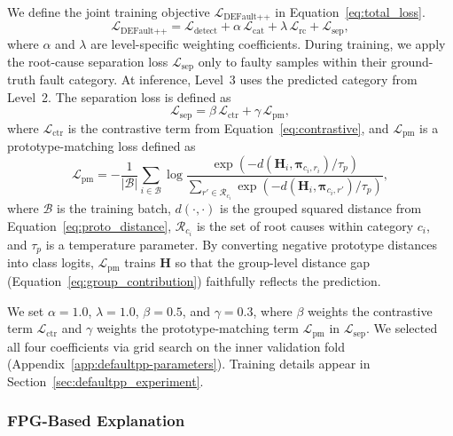 We define the joint training objective $\mathcal{L}_{\text{DEFault++}}$ in Equation~\ref{eq:total_loss}.
\begin{equation}
\mathcal{L}_{\text{DEFault++}} = \mathcal{L}_{\text{detect}} + \alpha \, \mathcal{L}_{\text{cat}} + \lambda \, \mathcal{L}_{\text{rc}} + \mathcal{L}_{\text{sep}},
\label{eq:total_loss}
\end{equation}
where $\alpha$ and $\lambda$ are level-specific weighting coefficients. During training, we apply the root-cause separation loss $\mathcal{L}_{\text{sep}}$ only to faulty samples within their ground-truth fault category. At inference, Level~3 uses the predicted category from Level~2. The separation loss is defined as
\begin{equation}
\mathcal{L}_{\text{sep}} = \beta \, \mathcal{L}_{\text{ctr}} + \gamma \, \mathcal{L}_{\text{pm}},
\label{eq:separation_loss}
\end{equation}
where $\mathcal{L}_{\text{ctr}}$ is the contrastive term from Equation~\ref{eq:contrastive}, and $\mathcal{L}_{\text{pm}}$ is a prototype-matching loss defined as
\begin{equation}
\mathcal{L}_{\text{pm}} = -\frac{1}{|\mathcal{B}|} \sum_{i \in \mathcal{B}} \log \frac{\exp(-d(\mathbf{H}_i, \symbf{\pi}_{c_i, r_i}) / \tau_p)}{\sum_{r' \in \mathcal{R}_{c_i}} \exp(-d(\mathbf{H}_i, \symbf{\pi}_{c_i, r'}) / \tau_p)},
\label{eq:proto_matching}
\end{equation}
where $\mathcal{B}$ is the training batch, $d(\cdot, \cdot)$ is the grouped squared distance from Equation~\ref{eq:proto_distance}, $\mathcal{R}_{c_i}$ is the set of root causes within category $c_i$, and $\tau_p$ is a temperature parameter. By converting negative prototype distances into class logits, $\mathcal{L}_{\text{pm}}$ trains $\mathbf{H}$ so that the group-level distance gap (Equation~\ref{eq:group_contribution}) faithfully reflects the prediction.

We set $\alpha = 1.0$, $\lambda = 1.0$, $\beta = 0.5$, and $\gamma = 0.3$, where $\beta$ weights the contrastive term $\mathcal{L}_{\text{ctr}}$ and $\gamma$ weights the prototype-matching term $\mathcal{L}_{\text{pm}}$ in $\mathcal{L}_{\text{sep}}$. We selected all four coefficients via grid search on the inner validation fold (Appendix~\ref{app:defaultpp-parameters}). Training details appear in Section~\ref{sec:defaultpp_experiment}.

\subsubsection{FPG-Based Explanation}
\label{sec:defaultpp_explainability}

